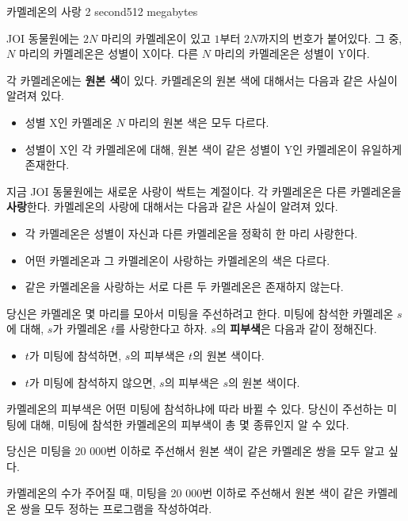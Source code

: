 \begin{problem}{카멜레온의 사랑}
	{}{}
	{2 second}{512 megabytes}{}
	
	JOI 동물원에는 $2N$ 마리의 카멜레온이 있고 $1$부터 $2N$까지의 번호가 붙어있다. 그 중, $N$ 마리의 카멜레온은 성별이 X이다. 다른 $N$ 마리의 카멜레온은 성별이 Y이다.
	
	각 카멜레온에는 \textbf{원본 색}이 있다. 카멜레온의 원본 색에 대해서는 다음과 같은 사실이 알려져 있다.
	
	\begin{itemize}
		\item 성별 X인 카멜레온 $N$ 마리의 원본 색은 모두 다르다.
		\item 성별이 X인 각 카멜레온에 대해, 원본 색이 같은 성별이 Y인 카멜레온이 유일하게 존재한다.
	\end{itemize}
	
	지금 JOI 동물원에는 새로운 사랑이 싹트는 계절이다. 각 카멜레온은 다른 카멜레온을 \textbf{사랑}한다. 카멜레온의 사랑에 대해서는 다음과 같은 사실이 알려져 있다.
	
	\begin{itemize}
		\item 각 카멜레온은 성별이 자신과 다른 카멜레온을 정확히 한 마리 사랑한다.
		\item 어떤 카멜레온과 그 카멜레온이 사랑하는 카멜레온의 색은 다르다.
		\item 같은 카멜레온을 사랑하는 서로 다른 두 카멜레온은 존재하지 않는다.
	\end{itemize}

	당신은 카멜레온 몇 마리를 모아서 미팅을 주선하려고 한다. 미팅에 참석한 카멜레온 $s$에 대해, $s$가 카멜레온 $t$를 사랑한다고 하자. $s$의 \textbf{피부색}은 다음과 같이 정해진다.
	
	\begin{itemize}
		\item $t$가 미팅에 참석하면, $s$의 피부색은 $t$의 원본 색이다.
		\item $t$가 미팅에 참석하지 않으면, $s$의 피부색은 $s$의 원본 색이다.
	\end{itemize}

	카멜레온의 피부색은 어떤 미팅에 참석하냐에 따라 바뀔 수 있다. 당신이 주선하는 미팅에 대해, 미팅에 참석한 카멜레온의 피부색이 총 몇 종류인지 알 수 있다.
	
	당신은 미팅을 20 000번 이하로 주선해서 원본 색이 같은 카멜레온 쌍을 모두 알고 싶다.
	
	카멜레온의 수가 주어질 때, 미팅을 20 000번 이하로 주선해서 원본 색이 같은 카멜레온 쌍을 모두 정하는 프로그램을 작성하여라.
	

\end{problem}
